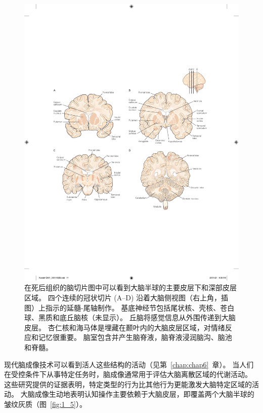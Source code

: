 \begin{figure}[htbp]
	\centering
	\includegraphics[width=0.8\linewidth]{chap01/fig_1_4}
	\caption{在死后组织的脑切片图中可以看到大脑半球的主要皮层下和深部皮层区域。
		四个连续的冠状切片 (A–D) 沿着大脑侧视图（右上角，插图）上指示的延髓-尾轴制作。
		基底神经节包括尾状核、壳核、苍白球、黑质和底丘脑核（未显示）。
		丘脑将感觉信息从外围传递到大脑皮层。
		杏仁核和海马体是埋藏在颞叶内的大脑皮层区域，对情绪反应和记忆很重要。
		脑室包含并产生脑脊液，脑脊液浸润脑沟、脑池和脊髓\cite{nieuwenhuys2007human}。}
	\label{fig:1_4}
\end{figure}


现代脑成像技术可以看到活人这些结构的活动（见第~\ref{chap:chap6}~章）。
当人们在受控条件下从事特定任务时，脑成像通常用于评估大脑离散区域的代谢活动。
这些研究提供的证据表明，特定类型的行为比其他行为更能激发大脑特定区域的活动。
大脑成像生动地表明认知操作主要依赖于大脑皮层，即覆盖两个大脑半球的皱纹灰质（图~\ref{fig:1_5}）。


